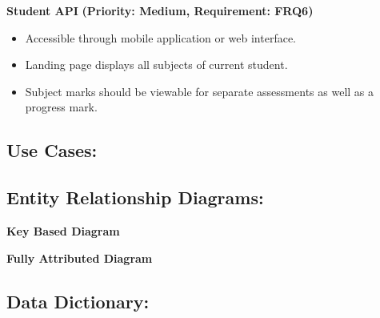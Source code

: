 \documentclass[12pt]{article}
\begin{document}
		\vspace{0.2in}
		
		\textbf{Student API}
		\textbf{(Priority: Medium, Requirement: FRQ6)}
		\begin{itemize}
			\item Accessible through mobile application or web interface.
			\item Landing page displays all subjects of current student.
			\item Subject marks should be viewable for separate assessments as well as a progress mark.
		\end{itemize}
		
	\vspace{0.2in}
	
		\subsection{Use Cases:}
		\vspace{0.1in}
		
		
		
	\vspace{0.2in}
	
		\subsection{Entity Relationship Diagrams:}
		\vspace{0.2in}
		

		\vspace{0.1in}

			\begin{center}
			\textbf{Key Based Diagram}
			\end{center}
		
		\vspace{0.3in}
		
		
		\begin{center}
			\textbf{Fully Attributed Diagram}
			\end{center}
		
		\vspace{0.3in}
		
		

		
	\vspace{0.1in}
	
		\subsection{Data Dictionary:}
		\vspace{0.1in}
		
\end{document}
